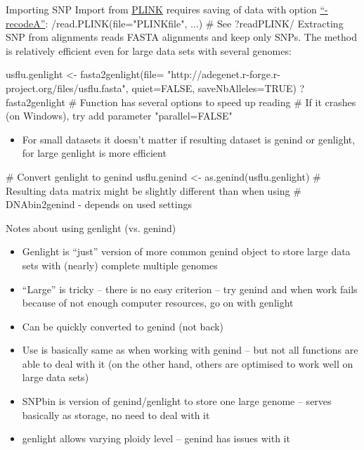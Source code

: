 \documentclass[compress, ucs, xelatex, 11pt, xcolor=svgnames,
  hyperref={
    bookmarks=true,
    unicode=true,
    colorlinks=true,
    pdftitle={Molecular data in R},
    plainpages=false,
    pdfauthor={Vojtech Zeisek},
    pdfsubject={Course about phylogeny and evolution in R},
    pdfcreator={XeLaTeX},
    pdfkeywords={R, evolution, phylogeny, molecular data},
    linkcolor=Tomato,
    anchorcolor=SaddleBrown,
    citecolor=Goldenrod,
    filecolor=DarkMagenta,
    menucolor=Sienna,
    urlcolor=DarkTurquoise,
    pdftex},
  url={hyphens, lowtilde} %
  ]{beamer}
\begin{document}
\begin{frame}[fragile]{Importing SNP}
Import from \href{http://pngu.mgh.harvard.edu/~purcell/plink/}{PLINK} requires saving of data with option \href{http://pngu.mgh.harvard.edu/~purcell/plink/dataman.shtml#recode}{``-recodeA''}:
\splus/read.PLINK(file="PLINKfile", ...) # See ?readPLINK/
Extracting SNP from alignments reads FASTA alignments and keep only SNPs. The method is relatively efficient even for large data sets with several genomes:
  \begin{spluscode}
    usflu.genlight <- fasta2genlight(file=
      "http://adegenet.r-forge.r-project.org/files/usflu.fasta",
      quiet=FALSE, saveNbAlleles=TRUE)
    ?fasta2genlight # Function has several options to speed up reading
    # If it crashes (on Windows), try add parameter "parallel=FALSE"
  \end{spluscode}
\begin{itemize}
 \item For small datasets it doesn't matter if resulting dataset is genind or genlight, for large genlight is more efficient
\end{itemize}
  \begin{spluscode}
    # Convert genlight to genind
    usflu.genind <- as.genind(usflu.genlight)
    # Resulting data matrix might be slightly different than when using
    # DNAbin2genind - depends on used settings
  \end{spluscode}
\end{frame}

\begin{frame}{Notes about using genlight (vs. genind)}
\begin{itemize}
 \item Genlight is ``just'' version of more common genind object to store large data sets with (nearly) complete multiple genomes
 \item ``Large'' is tricky -- there is no easy criterion -- try genind and when work fails because of not enough computer resources, go on with genlight
 \item Can be quickly converted to genind (not back)
 \item Use is basically same as when working with genind -- but not all functions are able to deal with it (on the other hand, others are optimised to work well on large data sets)
 \item SNPbin is version of genind/genlight to store one large genome -- serves basically as storage, no need to deal with it
 \item genlight allows varying ploidy level -- genind has issues with it
\end{itemize}
\end{frame}
\end{document}
